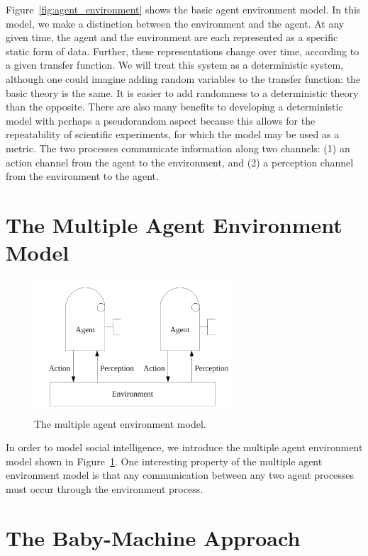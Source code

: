 Figure~\ref{fig:agent_environment} shows the basic agent environment
model.  In this model, we make a distinction between the environment
and the agent.  At any given time, the agent and the environment are
each represented as a specific static form of data.  Further, these
representations change over time, according to a given transfer
function.  We will treat this system as a deterministic system,
although one could imagine adding random variables to the transfer
function: the basic theory is the same.  It is easier to add
randomness to a deterministic theory than the opposite.  There are
also many benefits to developing a deterministic model with perhaps a
pseudorandom aspect because this allows for the repeatability of
scientific experiments, for which the model may be used as a metric.
The two processes communicate information along two channels: (1) an
action channel from the agent to the environment, and (2) a perception
channel from the environment to the agent.

\section{The Multiple Agent Environment Model}

\begin{figure}[bth]
  \center
  \includegraphics[height=5cm]{gfx/multiple_agent_environment}
  \caption[The multiple agent environment model]{The multiple agent environment model.}
  \label{fig:multiple_agent_environment}
\end{figure}

In order to model social intelligence, we introduce the multiple agent
environment model shown in
Figure~\ref{fig:multiple_agent_environment}.  One interesting property
of the multiple agent environment model is that any communication
between any two agent processes must occur through the environment
process.


\section{The Baby-Machine Approach}

